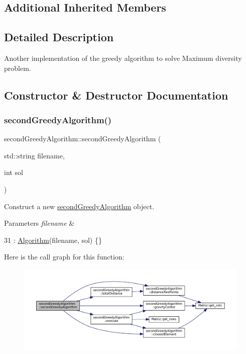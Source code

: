 \subsection*{Additional Inherited Members}


\subsection{Detailed Description}
Another implementation of the greedy algorithm to solve Maximum diversity problem. 

\subsection{Constructor \& Destructor Documentation}
\mbox{\label{classsecondGreedyAlgorithm_acbb57b3cc5b088ee401be24841e10eef}} 
\subsubsection{\texorpdfstring{second\+Greedy\+Algorithm()}{secondGreedyAlgorithm()}}
{\footnotesize\ttfamily second\+Greedy\+Algorithm\+::second\+Greedy\+Algorithm (\begin{DoxyParamCaption}\item[{std\+::string}]{filename,  }\item[{int}]{sol }\end{DoxyParamCaption})\hspace{0.3cm}{\ttfamily [inline]}}



Construct a new \hyperlink{classsecondGreedyAlgorithm}{second\+Greedy\+Algorithm} object. 


\begin{DoxyParams}{Parameters}
{\em filename} & \\
\hline
\end{DoxyParams}

\begin{DoxyCode}
31 : \hyperlink{classAlgorithm_a3c199c8528aae86f06ac515d5102fa09}{Algorithm}(filename, sol) \{\}
\end{DoxyCode}
Here is the call graph for this function\+:
\nopagebreak
\begin{figure}[H]
\begin{center}
\leavevmode
\includegraphics[width=350pt]{classsecondGreedyAlgorithm_acbb57b3cc5b088ee401be24841e10eef_cgraph}
\end{center}
\end{figure}


